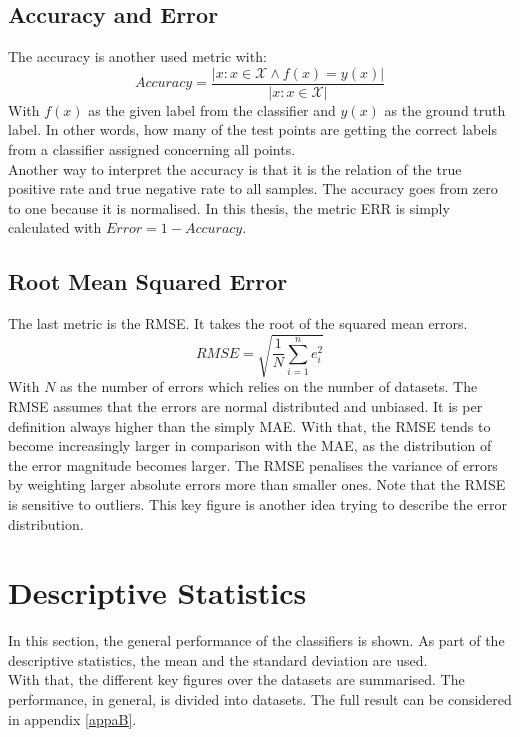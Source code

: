 \subsection{Accuracy and Error}
The accuracy is another used metric with:\cite{Long.2015}
\begin{equation}
	Accuracy = \frac{| x : x \in \mathcal{X} \wedge f(x) = y(x)|}{|x : x \in \mathcal{X}|}
\end{equation}
With $f(x)$ as the given label from the classifier and $y(x)$ as the ground truth label.
In other words, how many of the test points are getting the correct labels from a classifier assigned concerning all points.\\
Another way to interpret the accuracy is that it is the relation of the true positive rate and true negative rate to all samples.
The accuracy goes from zero to one because it is normalised.\cite[p. 3]{Fawcett.}
In this thesis, the metric \ac{ERR} is simply calculated with  $Error = 1 - Accuracy$.\\
\subsection{Root Mean Squared Error}
The last metric is the \ac{RMSE}. It takes the root of the squared mean errors.
\begin{equation}
	RMSE = \sqrt{\frac{1}{N} \sum_{i=1}^{n}e_i^2}
\end{equation}
With $N$ as the number of errors which relies on the number of datasets. The  \ac{RMSE} assumes that the errors are normal distributed and unbiased.
It is per definition always higher than the simply \ac{MAE}.
With that, the \acs{RMSE} tends to become increasingly larger in comparison with the \acs{MAE}, as the distribution of the error magnitude becomes larger. 
The \acs{RMSE} penalises the variance of errors by weighting larger absolute errors more than smaller ones.
Note that the \acs{RMSE} is sensitive to outliers.
This key figure is another idea trying to describe the error distribution. \cite{Chai.2014}
\FloatBarrier
\section{Descriptive Statistics}\label{EmSecTest}
In this section, the general performance of the classifiers is shown.
As part of the descriptive statistics, the mean and the standard deviation are used.\cite{Igual.2017}\\
With that, the different key figures over the datasets are summarised.
The performance, in general, is divided into datasets. The full result can be considered in appendix \ref{appaB}.

